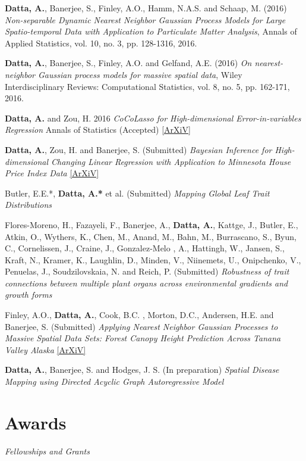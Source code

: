 \documentclass[11pt,a4paper,sans]{moderncv} %
\begin{document}
{\vskip 4mm \textbf{Datta, A.}, Banerjee, S., Finley, A.O., Hamm, N.A.S. and Schaap, M. (2016) {\em Non-separable Dynamic Nearest Neighbor Gaussian Process Models for Large Spatio-temporal Data with Application to Particulate Matter Analysis}, Annals of Applied Statistics, vol. 10, no. 3, pp. 128-1316, 2016.

\vskip 4mm \textbf {Datta, A.}, Banerjee, S., Finley, A.O. and Gelfand, A.E. (2016) {\em On nearest-neighbor Gaussian process models for massive spatial data}, Wiley Interdisciplinary Reviews: Computational Statistics, vol. 8, no. 5, pp. 162-171, 2016.

\vskip 4mm \textbf{Datta, A.} and Zou, H. 2016 {\em CoCoLasso for High-dimensional Error-in-variables Regression} Annals of Statistics (Accepted) \href{https://arxiv.org/pdf/1510.07123v2.pdf}{[ArXiV]}

\vskip 4mm \textbf{Datta, A.}, Zou, H. and Banerjee, S. (Submitted) {\em Bayesian Inference for High-dimensional Changing Linear Regression with Application to Minnesota House Price Index Data}  \href{https://arxiv.org/pdf/1510.07129.pdf}{[ArXiV]}

\vskip 2mm Butler, E.E.*, \textbf {Datta, A.*} et al. (Submitted) {\em Mapping Global Leaf Trait Distributions}

\vskip 2mm Flores-Moreno, H.,   Fazayeli, F.,   Banerjee, A.,   \textbf{Datta, A.},   Kattge, J.,   Butler, E.,   Atkin, O.,   Wythers, K.,   Chen, M.,   Anand, M.,   Bahn, M.,   Burrascano, S.,   Byun, C.,   Cornelissen, J.,   Craine, J.,   Gonzalez-Melo , A.,   Hattingh, W.,   Jansen, S.,   Kraft, N.,   Kramer, K.,   Laughlin, D.,   Minden, V.,  Niinemets, U.,   Onipchenko, V., Penuelas, J.,   Soudzilovskaia, N.   and   Reich, P. (Submitted) {\em Robustness of trait connections between multiple plant organs across environmental gradients and growth forms}


\vskip 4mm Finley, A.O., \textbf{Datta, A.}, Cook, B.C. ,  Morton, D.C., Andersen, H.E. and Banerjee, S. (Submitted) {\em Applying Nearest Neighbor Gaussian Processes to Massive Spatial Data Sets: Forest Canopy Height Prediction Across Tanana Valley Alaska} \href{https://arxiv.org/pdf/1702.00434.pdf}{[ArXiV]}

\vskip 4mm \textbf{Datta, A.}, Banerjee, S. and Hodges, J. S. (In preparation) {\em Spatial Disease Mapping using Directed Acyclic Graph Autoregressive Model}

\section{Awards}
{\em Fellowships and Grants \vskip 2mm}

}
\end{document}
